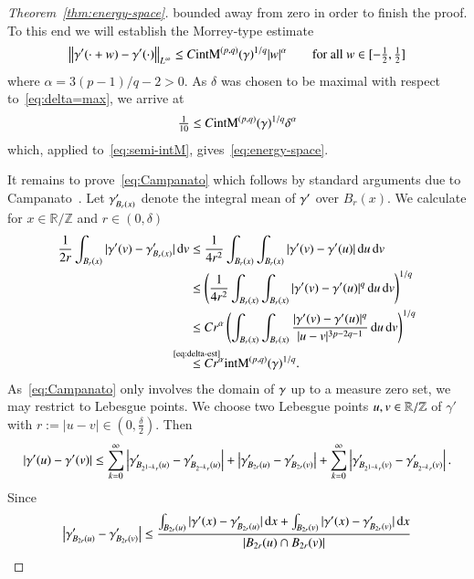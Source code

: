 \begin{proof}[Theorem~\ref{thm:energy-space}]
bounded away from zero in order to finish the proof.
To this end we will establish the Morrey-type estimate
 \begin{equation}\label{eq:Campanato}
  \lnorm[\infty]{\gamma'(\cdot+w) - \gamma'(\cdot)} \leq C \E(\g)^{1/q} |w|^{\alpha}
  \qquad\text{for all }w\in[-\tfrac12,\tfrac12]
 \end{equation}
 where $\alpha = 3(p-1)/q-2>0$.
 As $\delta$ was chosen to be maximal with respect to~\eqref{eq:delta=max},
 we arrive at
 \begin{equation*}
  \tfrac1{10} \le C \E(\g)^{1/q} \delta^{\alpha}
 \end{equation*}
 which, applied to~\eqref{eq:semi-intM}, gives~\eqref{eq:energy-space}.

It remains to prove~\eqref{eq:Campanato} which follows
by standard arguments due to Campanato~\cite{campanato}.
Let $\g'_{B_r (x)}$ denote the integral mean 
 of $\g'$ over $B_r(x)$. We calculate for $x \in \mathbb R / \mathbb Z$
 and $r \in (0,\delta)$ 
 \begin{align*}
  \frac 1 {2r}\int_{B_r(x)} |\gamma'(v)- \g'_{B_r(x)}| \d v
  &\leq \frac 1 {4r^2} \int_{B_r(x)} \int_{B_r(x)}| \gamma'(v) - \gamma'(u)| \d u \d v
  \\
  &\leq  \left(\frac 1 {4r^2} \int_{B_r(x)} \int_{B_r(x)}| \gamma'(v) - \gamma'(u)|^q \d u \d v\right)^{1/q}
  \\
  &\leq C r^{\alpha} \left(\int_{B_r(x)} \int_{B_r(x)} \frac{| \gamma'(v) - \gamma'(u)|^q} {|u-v|^{3p-2q-1}}\d u \d v\right)^{1/q} 
  \\
  &\refeq[\le]{delta-est} C r^{\alpha} \E(\g)^{1/q}.
 \end{align*}
 As~\eqref{eq:Campanato} only involves the domain of $\g$
 up to a measure zero set, we may restrict to Lebesgue points.
 We choose two Lebesgue points $u,v \in \mathbb R / \Z$ of $\gamma'$
 with $r:=|u-v| \in (0,\tfrac\delta2)$. Then
 \begin{equation*}
  |\dg(u) - \dg(v)| 
  \leq \sum_{k=0}^\infty \left| \dg_{B_{2^{1-k}r}(u)} - \dg_{B_{2^{-k}r}(u)} \right|
  + \left| \dg_{B_{2r}(u)} - \dg_{B_{2r}(v)} \right|
  + \sum_{k=0}^\infty \left| \dg_{B_{2^{1-k}r}(v)} - \dg_{B_{2^{-k}r}(v)} \right|.
  \end{equation*}
  Since
  \begin{align*}
   \left| \dg_{B_{2r}(u)} - \dg_{B_{2r}(v)} \right| 
   &\leq \frac {\int_{B_{2r}(u)} |\dg(x) - \dg_{B_{2r}(u)}| \d x +
    \int_{B_{2r}(v)} |\dg(x) - \dg_{B_{2r}(v)}| \d x} {|B_{2r} (u) \cap B_{2r}(v)|}
    \\

\end{align*}
\end{proof}
